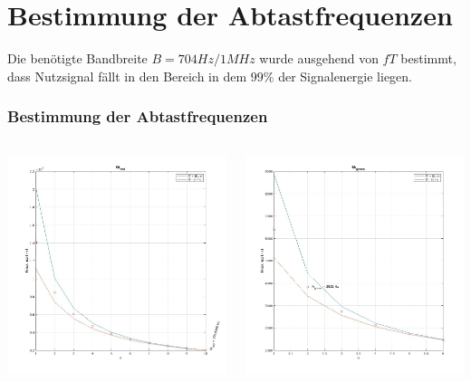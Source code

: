 \documentclass{beamer}
\begin{document}
\section{Bestimmung der Abtastfrequenzen}
\begin{frame}
  Die benötigte Bandbreite $B = 704Hz / 1MHz$ wurde ausgehend von $fT$ bestimmt, 
  dass Nutzsignal fällt in den Bereich
  in dem $99\%$ der Signalenergie liegen.
  \frametitle{Bestimmung der Abtastfrequenzen}
  \begin{columns}
    \begin{column}{0.5\textwidth}
      \includegraphics[width=\textwidth, height=0.7\textheight]{images/fAred.jpg}
    \end{column}
    \begin{column}{0.5\textwidth}
      \includegraphics[width=\textwidth, height=0.7\textheight]{images/fAgreen.jpg}

\end{column}
\end{columns}
\end{frame}
\end{document}

